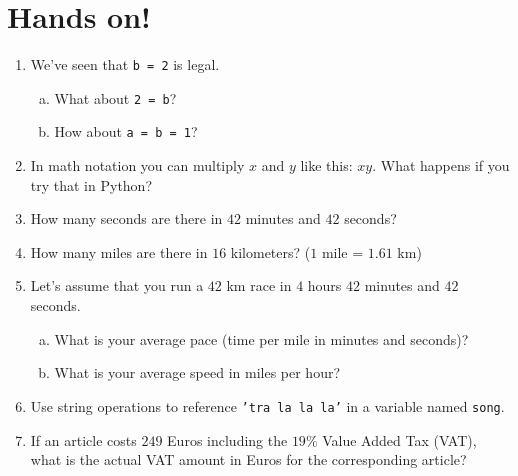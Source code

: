 \documentclass[aspectratio=1610,slidestop]{beamer}
\begin{document}
\section{Hands on!}
\begin{pframe}
 \vspace{-0.5cm}
 \begin{enumerate}
  \item We've seen that \texttt{b = 2} is legal.
  \begin{enumerate}[a.]
   \item What about \texttt{2 = b}?
   \item How about \texttt{a = b = 1}?
  \end{enumerate}
  \item In math notation you can multiply $x$ and $y$ like this: $xy$. What
  happens if you try that in Python?
  \item How many seconds are there in $42$ minutes and $42$ seconds?
  \item How many miles are there in $16$ kilometers? ($1$ mile = $1.61$ km)
  \item Let's assume that you run a $42$ km race in $4$ hours $42$ minutes and
  $42$ seconds.
  \begin{enumerate}[a.]
   \item What is your average pace (time per mile in minutes and seconds)?
   \item What is your average speed in miles per hour?
  \end{enumerate}
  \item Use string operations to reference \texttt{'tra la la la'}
  in a variable named \texttt{song}.
  \item If an article costs $249$ Euros including the $19\%$ Value Added Tax
  (VAT), what is the actual VAT amount in Euros for the corresponding article?
 \end{enumerate}

\end{pframe}


\end{document}
